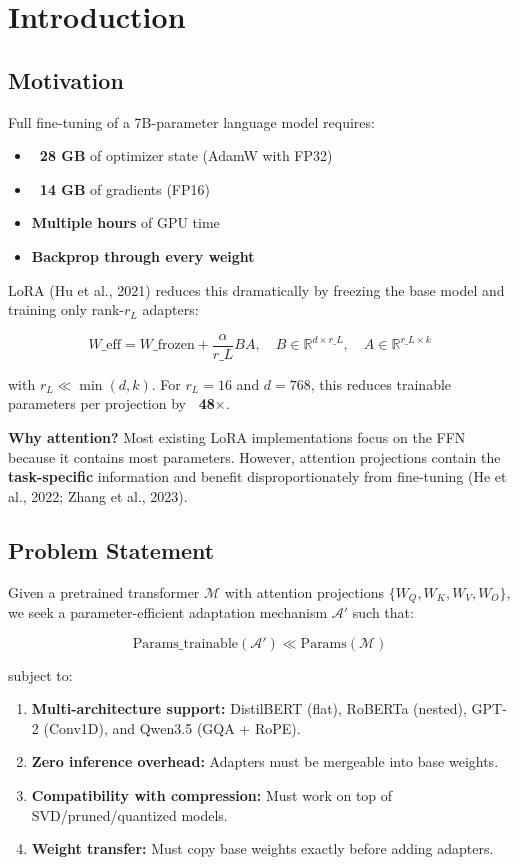 \section{Introduction}

\subsection{Motivation}

Full fine-tuning of a 7B-parameter language model requires:
\begin{itemize}
\item \textbf{~28 GB} of optimizer state (AdamW with FP32)
\item \textbf{~14 GB} of gradients (FP16)
\item \textbf{Multiple hours} of GPU time
\item \textbf{Backprop through every weight}

\end{itemize}
LoRA (Hu et al., 2021) reduces this dramatically by freezing the base model 
and training only rank-$r_L$ adapters:

\[
W\_\text{eff} = W\_\text{frozen} + \frac{\alpha}{r\_L} B A, \quad
B \in \mathbb{R}^{d \times r\_L}, \quad A \in \mathbb{R}^{r\_L \times k}
\tag{1.1}
\]

with $r_L \ll \min(d, k)$. For $r_L = 16$ and $d = 768$, this reduces 
trainable parameters per projection by \textbf{~48$\times$}.

\textbf{Why attention?} Most existing LoRA implementations focus on the FFN 
because it contains most parameters. However, attention projections contain 
the \textbf{task-specific} information and benefit disproportionately from 
fine-tuning (He et al., 2022; Zhang et al., 2023).

\subsection{Problem Statement}

Given a pretrained transformer $\mathcal{M}$ with attention projections 
$\{W_Q, W_K, W_V, W_O\}$, we seek a parameter-efficient adaptation mechanism 
$\mathcal{A}'$ such that:

\[
\text{Params}\_\text{trainable}(\mathcal{A}') \ll \text{Params}(\mathcal{M})
\tag{1.2}
\]

subject to:

\begin{enumerate}
\item \textbf{Multi-architecture support:} DistilBERT (flat), RoBERTa (nested),
  GPT-2 (Conv1D), and Qwen3.5 (GQA + RoPE).
\item \textbf{Zero inference overhead:} Adapters must be mergeable into base weights.
\item \textbf{Compatibility with compression:} Must work on top of SVD/pruned/quantized
  models.
\item \textbf{Weight transfer:} Must copy base weights exactly before adding adapters.

\end{enumerate}
